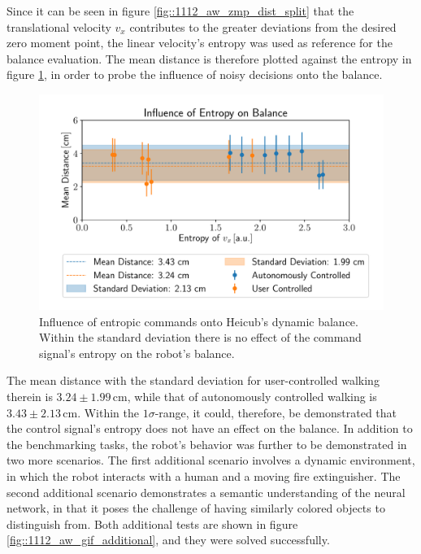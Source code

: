 Since it can be seen in figure \ref{fig::1112_aw_zmp_dist_split} that the translational velocity $v_x$ contributes to the greater deviations from the desired zero moment point, the linear velocity's entropy was used as reference for the balance evaluation. The mean distance is therefore plotted against the entropy in figure \ref{fig::1112_entropy_balance}, in order to probe the influence of noisy decisions onto the balance.
\begin{figure}[h!]
	\centering
	\includegraphics[scale=.5]{chapters/11_autonomous_walking_experiments/img/entropy_against_balance.pdf}
	\caption{Influence of entropic commands onto Heicub's dynamic balance. Within the standard deviation there is no effect of the command signal's entropy on the robot's balance.}
	\label{fig::1112_entropy_balance}
\end{figure}
The mean distance with the standard deviation for user-controlled walking therein is $3.24\pm1.99\,\text{cm}$, while that of autonomously controlled walking is $3.43\pm2.13\,\text{cm}$. Within the $1\sigma$-range, it could, therefore, be demonstrated that the control signal's entropy does not have an effect on the balance. In addition to the benchmarking tasks, the robot's behavior was further to be demonstrated in two more scenarios. The first additional scenario involves a dynamic environment, in which the robot interacts with a human and a moving fire extinguisher. The second additional scenario demonstrates a semantic understanding of the neural network, in that it poses the challenge of having similarly colored objects to distinguish from. Both additional tests are shown in figure \ref{fig::1112_aw_gif_additional}, and they were solved successfully.
